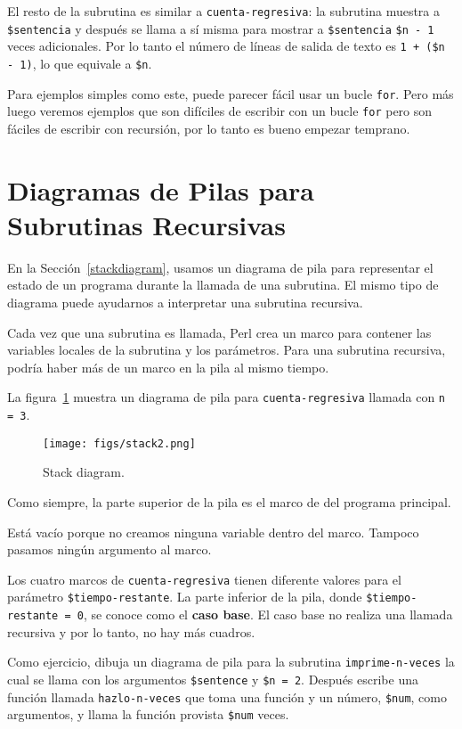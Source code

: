 El resto de la subrutina es similar a {\tt cuenta-regresiva}:
la subrutina muestra a {\tt \$sentencia} y después se llama 
a sí misma para mostrar a {\tt \$sentencia} \verb|$n - 1| veces
adicionales. Por lo tanto el número de líneas de salida de
texto es {\tt 1 + (\$n - 1)}, lo que equivale a {\tt \$n}.

Para ejemplos simples como este, puede parecer fácil usar
un bucle {\tt for}. Pero más luego veremos ejemplos que son
difíciles de escribir con un bucle {\tt for} pero son
fáciles de escribir con recursión, por lo tanto es bueno
empezar temprano.


\section{Diagramas de Pilas para Subrutinas Recursivas}
\label{recursive.stack}

En la Sección~\ref{stackdiagram}, usamos un diagrama de pila 
para representar el estado de un programa durante la llamada de 
una subrutina. El mismo tipo de diagrama puede ayudarnos a interpretar una subrutina recursiva.

Cada vez que una subrutina es llamada, Perl crea un 
marco para contener las variables locales de la subrutina y 
los parámetros. Para una subrutina recursiva, podría haber más
de un marco en la pila al mismo tiempo.

La figura~\ref{fig.stack2} muestra un diagrama de pila para 
{\tt cuenta-regresiva} llamada con {\tt n = 3}.

\begin{figure}
\centerline
{\texttt{[image: figs/stack2.png]}}
\caption{Stack diagram.}
\label{fig.stack2}
\end{figure}


Como siempre, la parte superior de la pila es el marco de
del programa principal.

Está vacío porque no creamos ninguna variable dentro del marco.
Tampoco pasamos ningún argumento al marco.

Los cuatro marcos de {\tt cuenta-regresiva} tienen diferente valores
para el parámetro {\tt \$tiempo-restante}. La parte inferior de la 
pila, donde {\tt \$tiempo-restante = 0}, se conoce como el {\bf caso base}.
El caso base no realiza una llamada recursiva y por lo tanto, no hay más
cuadros.

Como ejercicio, dibuja un diagrama de pila para la subrutina \verb|imprime-n-veces|
la cual se llama con los argumentos \verb|$sentence| y {\tt \$n = 2}.
Después escribe una función llamada \verb|hazlo-n-veces| que toma una función
y un número, {\tt \$num}, como argumentos, y llama la función 
provista {\tt \$num} veces.
\label{do_n_times}

